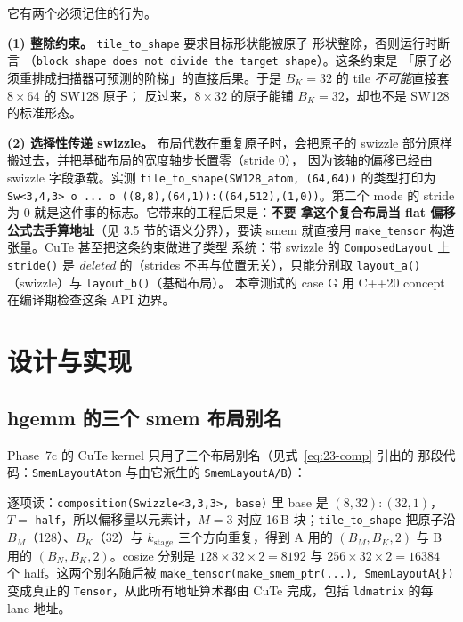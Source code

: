 它有两个必须记住的行为。

\textbf{(1) 整除约束。} \texttt{tile\_\allowbreak{}to\_\allowbreak{}shape} 要求目标形状能被原子
形状整除，否则运行时断言
（\texttt{block shape does not divide the target shape}）。这条约束是
「原子必须重排成扫描器可预测的阶梯」的直接后果。于是
$B_K=32$ 的 tile \emph{不可能}直接套 $8\times64$ 的 SW128 原子；
反过来，$8\times32$ 的原子能铺 $B_K=32$，却也不是 SW128 的标准形态。

\textbf{(2) 选择性传递 swizzle。} 布局代数在重复原子时，会把原子的
swizzle 部分原样搬过去，并把基础布局的宽度轴步长置零（stride 0），
因为该轴的偏移已经由 swizzle 字段承载。实测
\texttt{tile\_\allowbreak{}to\_\allowbreak{}shape\allowbreak{}(SW128\_\allowbreak{}atom,\allowbreak{} (64,\allowbreak{}64))} 的类型打印为
\texttt{Sw\allowbreak{}<3,\allowbreak{}4,\allowbreak{}3> o ... o \allowbreak{}(\allowbreak{}(8,\allowbreak{}8),\allowbreak{}(64,\allowbreak{}1)):\allowbreak{}(\allowbreak{}(64,\allowbreak{}512),\allowbreak{}(1,\allowbreak{}0))}。第二个
mode 的 stride 为 0 就是这件事的标志。它带来的工程后果是：\textbf{不要
拿这个复合布局当 flat 偏移公式去手算地址}（见 3.5 节的语义分界），要读
smem 就直接用 \texttt{make\_tensor} 构造张量。CuTe 甚至把这条约束做进了类型
系统：带 swizzle 的 \texttt{Composed\allowbreak{}Layout} 上 \texttt{stride()} 是
\emph{deleted} 的（strides 不再与位置无关），只能分别取
\texttt{layout\_a()}（swizzle）与 \texttt{layout\_b()}（基础布局）。
本章测试的 case G 用 C++20 concept 在编译期检查这条 API 边界。

\section{设计与实现}

\subsection{hgemm 的三个 smem 布局别名}

Phase~7c 的 CuTe kernel 只用了三个布局别名（见式~\eqref{eq:23-comp} 引出的
那段代码：\texttt{Smem\allowbreak{}Layout\allowbreak{}Atom} 与由它派生的 \texttt{Smem\allowbreak{}Layout\allowbreak{}A/\allowbreak{}B}）：

逐项读：\texttt{composition\allowbreak{}(Swizzle\allowbreak{}<3,\allowbreak{}3,\allowbreak{}3>,\allowbreak{} base)} 里 base 是
$(8,32){:}(32,1)$，$T=$ \texttt{half}，所以偏移量以元素计，$M=3$ 对应
16\,B 块；\texttt{tile\_\allowbreak{}to\_\allowbreak{}shape} 把原子沿 $B_M$（128）、$B_K$（32）与
$k_{\text{stage}}$ 三个方向重复，得到 A 用的 $(B_M,B_K,2)$ 与 B 用的
$(B_N,B_K,2)$。cosize 分别是 $128\times32\times2=8192$ 与
$256\times32\times2=16384$ 个 half。这两个别名随后被
\texttt{make\_\allowbreak{}tensor\allowbreak{}(make\_\allowbreak{}smem\_\allowbreak{}ptr\allowbreak{}(.\allowbreak{}.\allowbreak{}.\allowbreak{}),\allowbreak{} Smem\allowbreak{}Layout\allowbreak{}A\{\})} 变成真正的
\texttt{Tensor}，从此所有地址算术都由 CuTe 完成，包括
\texttt{ldmatrix} 的每 lane 地址。


